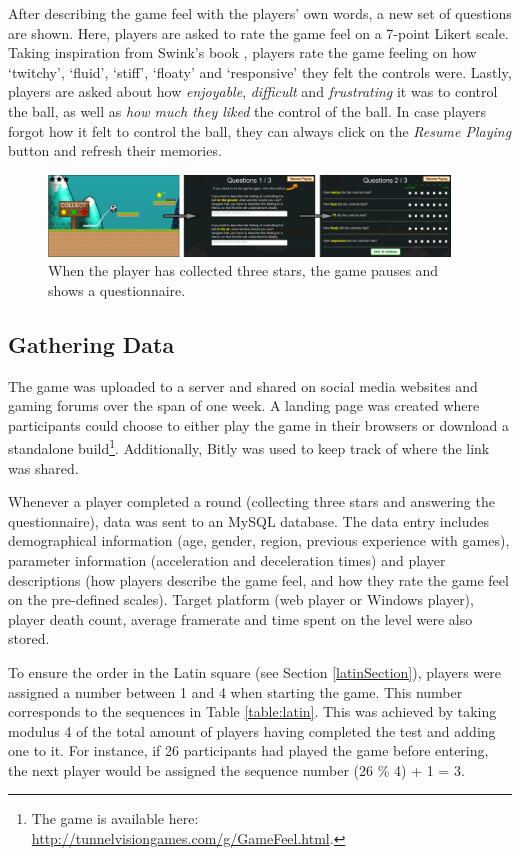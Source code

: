 After describing the game feel with the players' own words, a new set of questions are shown. Here, players are asked to rate the game feel on a 7-point Likert scale. Taking inspiration from Swink's book \cite{swink}, players rate the game feeling on how `twitchy', `fluid', `stiff', `floaty' and `responsive' they felt the controls were. Lastly, players are asked about how \textit{enjoyable}, \textit{difficult} and \textit{frustrating} it was to control the ball, as well as \textit{how much they liked} the control of the ball. In case players forgot how it felt to control the ball, they can always click on the \textit{Resume Playing} button and refresh their memories.

\begin{figure}[htbp]
\centering
\includegraphics[width=0.95\textwidth]{Pics/game_phases}
\caption{When the player has collected three stars, the game pauses and shows a questionnaire.}
\label{fig:questionnaire}
\end{figure}

\subsection{Gathering Data}
The game was uploaded to a server and shared on social media websites and gaming forums over the span of one week. A landing page was created where participants could choose to either play the game in their browsers or download a standalone build\footnote{The game is available here: \\ \url{http://tunnelvisiongames.com/g/GameFeel.html}.}. Additionally, Bitly \cite{bitly} was used to keep track of where the link was shared.

Whenever a player completed a round (collecting three stars and answering the questionnaire), data was  sent to an MySQL database. The data entry includes demographical information (age, gender, region, previous experience with games), parameter information (acceleration and deceleration times) and player descriptions (how players describe the game feel, and how they rate the game feel on the pre-defined scales). Target platform (web player or Windows player), player death count, average framerate and time spent on the level were also stored.

To ensure the order in the Latin square (see Section \ref{latinSection}), players were assigned a number between 1 and 4 when starting the game. This number corresponds to the sequences in Table \ref{table:latin}. This was achieved by taking modulus 4 of the total amount of players having completed the test and adding one to it. For instance, if 26 participants had played the game before entering, the next player would be assigned the sequence number (26 \% 4) + 1 = 3.